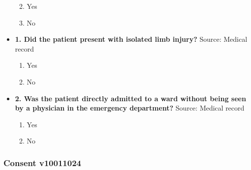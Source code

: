 \documentclass[
]{scrartcl}
\providecommand{\tightlist}{%
  \setlength{\itemsep}{0pt}\setlength{\parskip}{0pt}}\usepackage{longtable,booktabs,array}
\begin{document}
\begin{itemize}
  \begin{enumerate}
  \def\labelenumi{\arabic{enumi}.}
  \tightlist
  \item
    Yes
  \item
    No
  \end{enumerate}
\item
  \textbf{1. Did the patient present with isolated limb injury?} Source:
  Medical record

  \begin{enumerate}
  \def\labelenumi{\arabic{enumi}.}
  \tightlist
  \item
    Yes
  \item
    No
  \end{enumerate}
\item
  \textbf{2. Was the patient directly admitted to a ward without being
  seen by a physician in the emergency department?} Source: Medical
  record

  \begin{enumerate}
  \def\labelenumi{\arabic{enumi}.}
  \tightlist
  \item
    Yes
  \item
    No
  \end{enumerate}
\end{itemize}

\hypertarget{consent-v10011024}{%
\subsubsection{Consent v10011024}\label{consent-v10011024}}
\end{document}
